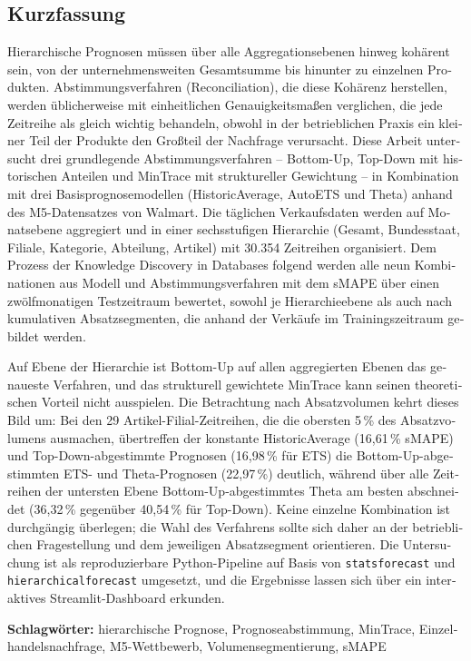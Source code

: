 \cleardoublepage

\begin{otherlanguage}{ngerman}
\chapter*{Kurzfassung}

Hierarchische Prognosen müssen über alle Aggregationsebenen hinweg kohärent sein, von der unternehmensweiten Gesamtsumme bis hinunter zu einzelnen Produkten. Abstimmungsverfahren (Reconciliation), die diese Kohärenz herstellen, werden üblicherweise mit einheitlichen Genauigkeitsmaßen verglichen, die jede Zeitreihe als gleich wichtig behandeln, obwohl in der betrieblichen Praxis ein kleiner Teil der Produkte den Großteil der Nachfrage verursacht. Diese Arbeit untersucht drei grundlegende Abstimmungsverfahren -- Bottom-Up, Top-Down mit historischen Anteilen und MinTrace mit struktureller Gewichtung -- in Kombination mit drei Basisprognosemodellen (HistoricAverage, AutoETS und Theta) anhand des M5-Datensatzes von Walmart. Die täglichen Verkaufsdaten werden auf Monatsebene aggregiert und in einer sechsstufigen Hierarchie (Gesamt, Bundesstaat, Filiale, Kategorie, Abteilung, Artikel) mit 30.354 Zeitreihen organisiert. Dem Prozess der Knowledge Discovery in Databases folgend werden alle neun Kombinationen aus Modell und Abstimmungsverfahren mit dem sMAPE über einen zwölfmonatigen Testzeitraum bewertet, sowohl je Hierarchieebene als auch nach kumulativen Absatzsegmenten, die anhand der Verkäufe im Trainingszeitraum gebildet werden.

Auf Ebene der Hierarchie ist Bottom-Up auf allen aggregierten Ebenen das genaueste Verfahren, und das strukturell gewichtete MinTrace kann seinen theoretischen Vorteil nicht ausspielen. Die Betrachtung nach Absatzvolumen kehrt dieses Bild um: Bei den 29 Artikel-Filial-Zeitreihen, die die obersten 5\,\% des Absatzvolumens ausmachen, übertreffen der konstante HistoricAverage (16,61\,\% sMAPE) und Top-Down-abgestimmte Prognosen (16,98\,\% für ETS) die Bottom-Up-abgestimmten ETS- und Theta-Prognosen (22,97\,\%) deutlich, während über alle Zeitreihen der untersten Ebene Bottom-Up-abgestimmtes Theta am besten abschneidet (36,32\,\% gegenüber 40,54\,\% für Top-Down). Keine einzelne Kombination ist durchgängig überlegen; die Wahl des Verfahrens sollte sich daher an der betrieblichen Fragestellung und dem jeweiligen Absatzsegment orientieren. Die Untersuchung ist als reproduzierbare Python-Pipeline auf Basis von \texttt{statsforecast} und \texttt{hierarchicalforecast} umgesetzt, und die Ergebnisse lassen sich über ein interaktives Streamlit-Dashboard erkunden.

\vspace{0.5cm}
\noindent\textbf{Schlagwörter:} hierarchische Prognose, Prognoseabstimmung, MinTrace, Einzelhandelsnachfrage, M5-Wettbewerb, Volumensegmentierung, sMAPE
\end{otherlanguage}
